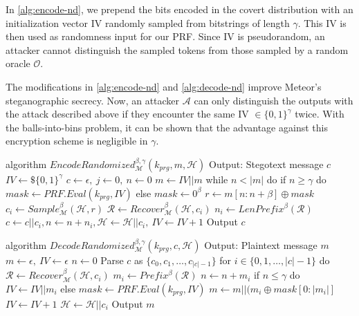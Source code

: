 In \autoref{alg:encode-nd}, we prepend the bits encoded in the covert distribution with an initialization vector IV randomly sampled from bitstrings of length $\gamma$.
This IV is then used as randomness input for our PRF.
Since IV is pseudorandom, an attacker cannot distinguish the sampled tokens from those sampled by a random oracle $\mathcal{O}$.

The modifications in \autoref{alg:encode-nd} and \autoref{alg:decode-nd} improve Meteor's steganographic secrecy.
Now, an attacker $\mathcal{A}$ can only distinguish the outputs with the attack described above if they encounter the same IV $\in \{ 0,1\}^\gamma$ twice.
With the balls-into-bins problem, it can be shown that the advantage against this encryption scheme is negligible in $\gamma$.
\begin{Pseudocode}[float, caption={
Meteor EncodeRandomized Algorithm.
This algorithm differs from the original Encode algorithm by sampling a random IV before encoding.
That IV is later used as randomness in a PRF used to generated the random masked.
The IV is incremented after each iteration of the encoding process.
The first $\gamma$ bits of the hiddentext encode the IV. 
The introduction of an IV does not negatively affect secrecy, since IV is indistinguishable from randomness.}, label={alg:encode-nd}]
algorithm $EncodeRandomized_{\mathcal{M}}^{\beta,\gamma}(k_{prg}, m, \mathcal{H})$
	Output: Stegotext message $c$
	$IV \leftarrow\$ \{0,1\}^\gamma$
	$c \leftarrow \epsilon,~ j \leftarrow 0,~ n \leftarrow 0$
	$m \leftarrow IV || m$
	while $n < |m|$ do
		if $n \geq \gamma$ do
			$mask \leftarrow PRF.Eval(k_{prg}, IV)$
		else
			$mask \leftarrow 0^\beta$
		$r \leftarrow m[n:n+\beta] \oplus mask$
		$c_i \leftarrow Sample_{\mathcal{M}}^\beta(\mathcal{H}, r)$
		$\mathcal{R} \leftarrow Recover_{\mathcal{M}}^\beta(\mathcal{H}, c_i)$
		$n_i \leftarrow LenPrefix^\beta(\mathcal{R})$
		$c \leftarrow c || c_i, n \leftarrow n+n_i, \mathcal{H} \leftarrow \mathcal{H}||c_i,~ IV \leftarrow IV+1$
	Output $c$
\end{Pseudocode}
\begin{Pseudocode}[float, caption={
Meteor DecodeRandomized Algorithm.
This algorithm differs from the original Decode algorithm by interpreting the first $\gamma$ bits of the hiddentext as IV.
After decoding $\gamma$ bits of hiddentext, a PRF is initialized with IV for generation of pseudorandom masks.}, label={alg:decode-nd}]
algorithm $DecodeRandomized_{\mathcal{M}}^{\beta,\gamma}(k_{prg}, c, \mathcal{H})$
	Output: Plaintext message $m$
	$m \leftarrow \epsilon,~ IV \leftarrow \epsilon$
	$n \leftarrow 0$
	Parse $c$ as $\{ c_0, c_1, \dots, c_{|c|-1} \}$
	for $i \in \{0, 1, \dots, |c|-1 \}$ do
		$\mathcal{R} \leftarrow Recover_{\mathcal{M}}^\beta(\mathcal{H}, c_i)$
		$m_i \leftarrow Prefix^\beta(\mathcal{R})$
		$n \leftarrow n + m_i$
		if $n \leq \gamma$ do
			$IV \leftarrow IV || m_i$
		else
			$mask \leftarrow PRF.Eval(k_{prg}, IV)$
			$m \leftarrow m || (m_i \oplus mask[0: |m_i|]$
			$IV \leftarrow IV + 1$
		$\mathcal{H} \leftarrow \mathcal{H}||c_i$
	Output $m$
\end{Pseudocode}